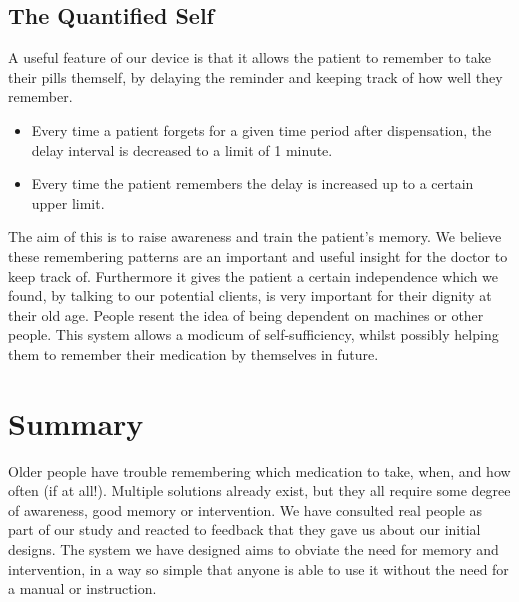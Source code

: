 \documentclass{article}
\begin{document}
	\subsection{The Quantified Self}
	A useful feature of our device is that it allows the patient to remember to take their pills themself, by delaying the reminder and keeping track of how well they remember.
	\begin{itemize}
	\item Every time a patient forgets for a given time period after dispensation, the delay interval is decreased to a limit of 1 minute.
	\item Every time the patient remembers the delay is increased up to a certain upper limit.
	\end{itemize}
	The aim of this is to raise awareness and train the patient's memory. We believe these remembering patterns are an important and useful insight for the doctor to keep track of. Furthermore it gives the patient a certain independence which we found, by talking to our potential clients, is very important for their dignity at their old age. People resent the idea of being dependent on machines or other people. This system allows a modicum of self-sufficiency, whilst possibly helping them to remember their medication by themselves in future.
	
\section{Summary}
Older people have trouble remembering which medication to take, when, and how often (if at all!). Multiple solutions already exist, but they all require some degree of awareness, good memory or intervention. We have consulted real people as part of our study and reacted to feedback that they gave us about our initial designs. The system we have designed aims to obviate the need for memory and intervention, in a way so simple that anyone is able to use it without the need for a manual or instruction.
\end{document}
